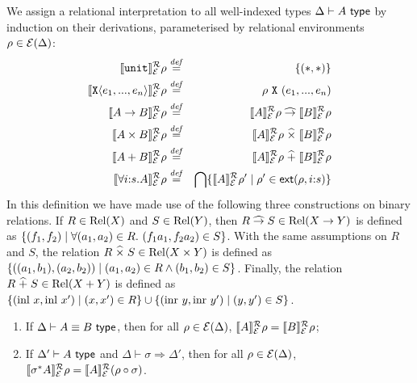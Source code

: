 We assign a relational interpretation to all well-indexed types
$\Delta \vdash A \textsf{ type}$ by induction on their derivations,
parameterised by relational environments $\rho \in
\mathcal{E}(\Delta)$:
\begin{eqnarray*}
  \llbracket \texttt{unit} \rrbracket^{\mathcal{R}}_{\mathcal{E}}{\rho} & \stackrel{\mathit{def}}= & \{(*,*)\} \\
  \llbracket \texttt{X}\langle e_1,...,e_n \rangle \rrbracket^{\mathcal{R}}_{\mathcal{E}}{\rho} & \stackrel{\mathit{def}}= & \rho\ {\texttt{X}}\ (e_1,...,e_n) \\
  \llbracket A \to B \rrbracket^{\mathcal{R}}_{\mathcal{E}}{\rho} & \stackrel{\mathit{def}}= & \llbracket A \rrbracket^{\mathcal{R}}_{\mathcal{E}}{\rho} \mathrel{\widehat\to} \llbracket B \rrbracket^{\mathcal{R}}_{\mathcal{E}}{\rho} \\
  \llbracket A \times B \rrbracket^{\mathcal{R}}_{\mathcal{E}}{\rho} & \stackrel{\mathit{def}}= & \llbracket A \rrbracket^{\mathcal{R}}_{\mathcal{E}}{\rho} \mathrel{\widehat\times} \llbracket B \rrbracket^{\mathcal{R}}_{\mathcal{E}}{\rho} \\
  \llbracket A + B \rrbracket^{\mathcal{R}}_{\mathcal{E}}{\rho} & \stackrel{\mathit{def}}= & \llbracket A \rrbracket^{\mathcal{R}}_{\mathcal{E}}{\rho} \mathrel{\widehat+} \llbracket B \rrbracket^{\mathcal{R}}_{\mathcal{E}}{\rho} \\
  \llbracket \forall i\mathord:s.A \rrbracket^{\mathcal{R}}_{\mathcal{E}}{\rho} & \stackrel{\mathit{def}}= & \bigcap\{ \llbracket A \rrbracket^{\mathcal{R}}_{\mathcal{E}}{\rho}' \mathrel| \rho' \in \mathsf{ext}(\rho,i\mathord:s) \}
\end{eqnarray*}
In this definition we have made use of the following three
constructions on binary relations. If $R \in \mathrm{Rel}(X)$ and $S \in
\mathrm{Rel}(Y)$, then $R \mathrel{\widehat\to} S \in \mathrm{Rel}(X \to Y)$ is defined as $\{
(f_1,f_2) \mathrel| \forall (a_1,a_2) \in R.\ (f_1a_1,f_2a_2) \in S
\}$. With the same assumptions on $R$ and $S$, the relation $R
\mathrel{\widehat\times} S \in \mathrm{Rel}(X \times Y)$ is defined as $\{
((a_1,b_1),(a_2,b_2)) \mathrel| (a_1,a_2) \in R \land (b_1,b_2) \in S
\}$. Finally, the relation $R \mathrel{\widehat+} S \in \mathrm{Rel}(X + Y)$ is defined as
$\{ (\mathrm{inl}\ x, \mathrm{inl}\ x') \mathrel| (x,x') \in R \} \cup
\{ (\mathrm{inr}\ y, \mathrm{inr}\ y') \mathrel| (y,y') \in S \}$.

\begin{lemma}\label{lem:tyeqsubst-relational}
  \begin{enumerate}
  \item If $\Delta \vdash A \equiv B \textsf{ type}$, then for all $\rho \in
    \mathcal{E}(\Delta)$, $\llbracket A \rrbracket^{\mathcal{R}}_{\mathcal{E}}{\rho} =
    \llbracket B \rrbracket^{\mathcal{R}}_{\mathcal{E}}{\rho}$;
  \item If $\Delta' \vdash A \textsf{ type}$ and $\Delta \vdash \sigma
    \Rightarrow \Delta'$, then for all $\rho \in \mathcal{E}(\Delta)$,
    $\llbracket \sigma^*A \rrbracket^{\mathcal{R}}_{\mathcal{E}}{\rho} = \llbracket A \rrbracket^{\mathcal{R}}_{\mathcal{E}}{(}\rho
    \circ \sigma)$.
  \end{enumerate}
\end{lemma}

